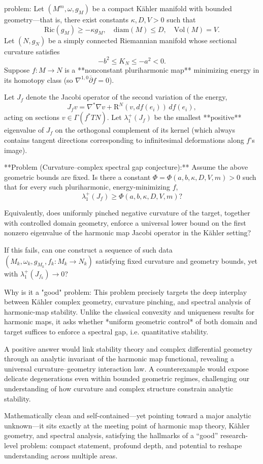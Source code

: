 problem:  
Let \( (M^{m}, \omega, g_M) \) be a compact Kähler manifold with bounded geometry---that is, there exist constants \( \kappa, D, V > 0 \) such that 
\[
\mathrm{Ric}(g_M) \ge -\kappa g_M, \quad \mathrm{diam}(M) \le D, \quad \mathrm{Vol}(M) = V.
\]
Let \( (N,g_N) \) be a simply connected Riemannian manifold whose sectional curvature satisfies
\[
 -b^2 \le K_N \le -a^2 < 0.
\]
Suppose \( f: M \to N \) is a **nonconstant pluriharmonic map** minimizing energy in its homotopy class (so \( \nabla^{1,0}\overline{\partial} f = 0 \)).  

Let \( J_f \) denote the Jacobi operator of the second variation of the energy,
\[
J_f v = \nabla^*\nabla v + \mathrm{R}^N(v, df(e_i))\,df(e_i),
\]
acting on sections \(v \in \Gamma(f^*TN)\).  
Let \( \lambda_1^+(J_f) \) be the smallest **positive** eigenvalue of \(J_f\) on the orthogonal complement of its kernel (which always contains tangent directions corresponding to infinitesimal deformations along \(f\)’s image).

**Problem (Curvature–complex spectral gap conjecture):**  
Assume the above geometric bounds are fixed.  
Is there a constant \( \Phi = \Phi(a,b,\kappa, D, V, m) > 0 \) such that for every such pluriharmonic, energy-minimizing \( f \),
\[
\lambda_1^+(J_f) \ge \Phi(a,b,\kappa, D, V, m)?
\]

Equivalently, does uniformly pinched negative curvature of the target, together with controlled domain geometry, enforce a universal lower bound on the first nonzero eigenvalue of the harmonic map Jacobi operator in the Kähler setting?  

If this fails, can one construct a sequence of such data \((M_k,\omega_k, g_{M_k}, f_k: M_k \to N_k)\) satisfying fixed curvature and geometry bounds, yet with \( \lambda_1^+(J_{f_k}) \to 0 \)?  

Why is it a "good" problem:  
This problem precisely targets the deep interplay between Kähler complex geometry, curvature pinching, and spectral analysis of harmonic-map stability. Unlike the classical convexity and uniqueness results for harmonic maps, it asks whether *uniform geometric control* of both domain and target suffices to enforce a spectral gap, i.e. quantitative stability.  

A positive answer would link stability theory and complex differential geometry through an analytic invariant of the harmonic map functional, revealing a universal curvature–geometry interaction law. A counterexample would expose delicate degenerations even within bounded geometric regimes, challenging our understanding of how curvature and complex structure constrain analytic stability.  

Mathematically clean and self-contained—yet pointing toward a major analytic unknown—it sits exactly at the meeting point of harmonic map theory, Kähler geometry, and spectral analysis, satisfying the hallmarks of a “good” research-level problem: compact statement, profound depth, and potential to reshape understanding across multiple areas.